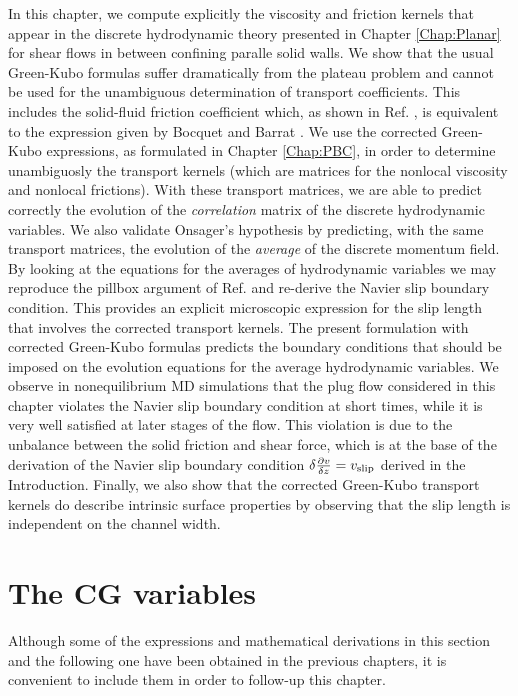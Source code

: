 \documentclass[b5paper,openright,10pt]{book}
\begin{document}
In this chapter, we compute explicitly the viscosity and friction kernels that appear in the discrete hydrodynamic theory presented in Chapter \ref{Chap:Planar} for shear flows in between confining paralle solid walls.  
We show  that  the  usual Green-Kubo  formulas  suffer
dramatically  from the  plateau problem  and  cannot be  used for  the
unambiguous  determination of  transport coefficients.   This includes
the solid-fluid friction coefficient which,  as shown in Ref. \cite{CamargoBC2018},
is  equivalent  to   the  expression  given  by   Bocquet  and  Barrat
\cite{Bocquet1994}.  We  use the corrected Green-Kubo  expressions, as
formulated in  Chapter \ref{Chap:PBC}, in  order to determine  unambiguosly the
transport kernels (which are matrices for the nonlocal viscosity and
nonlocal frictions).  With  these transport matrices, we  are able to
predict correctly the evolution  of the \textit{correlation} matrix of
the  discrete  hydrodynamic  variables.  We  also  validate  Onsager's
hypothesis  by  predicting,  with  the same  transport  matrices,  the
evolution of the \textit{average} of  the discrete momentum field.  By
looking at the equations for the averages of hydrodynamic variables we
may reproduce the pillbox argument of Ref.  \cite{CamargoBC2018} and re-derive the
Navier slip boundary condition.  This provides an explicit microscopic
expression for the  slip length that involves  the corrected transport
kernels.  The  present formulation with corrected  Green-Kubo formulas
predicts  the  boundary  conditions  that should  be  imposed  on  the
evolution equations for the average hydrodynamic variables. We observe
in nonequilibrium  MD simulations  that the  plug flow  considered in
this chapter violates the Navier slip boundary condition at short times,
while it is very  well  satisfied at  later stages  of  the flow.   This
violation is due to the unbalance between the solid friction and shear
force,  which is  at the  base of  the derivation  of the  Navier slip
boundary  condition $\delta\frac{\partial v}{\delta z}=v_{{\rm slip}}$ derived in the Introduction.   Finally, we  also show  that the
corrected Green-Kubo  transport kernels do describe  intrinsic surface
properties by  observing that  the slip length  is independent  on the
channel width.

\section{The CG variables}
\label{Sec:CGSlip}
Although some of the expressions and mathematical derivations in this section and the following one  have been obtained in the previous chapters, it is convenient to include them in order to follow-up this chapter.
\end{document}
